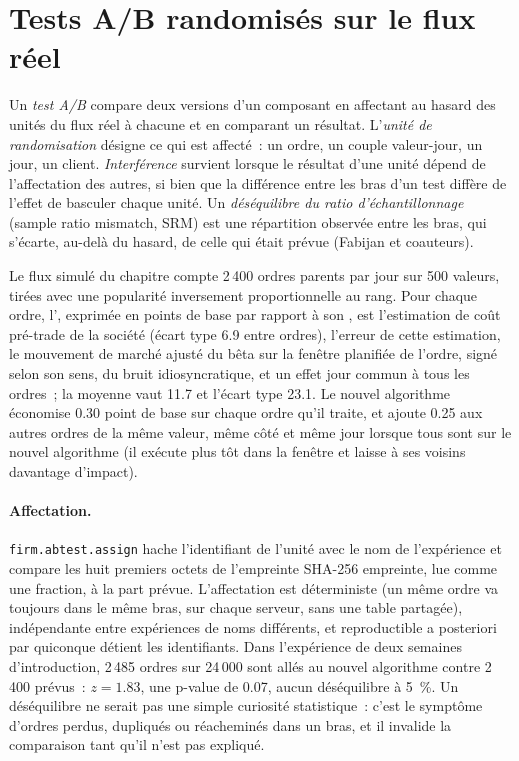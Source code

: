\section{Tests A/B randomisés sur le flux réel}

\begin{definition}\label{def:rs:live-experiments:ab}
Un \emph{test A/B} compare deux versions d'un composant en affectant au hasard des unités du flux réel à chacune et en comparant un résultat.
L'\emph{unité de randomisation} désigne ce qui est affecté~: un ordre, un couple valeur-jour, un jour, un client. \emph{Interférence}
survient lorsque le résultat d'une unité dépend de l'affectation des autres, si bien que la différence entre les bras d'un test diffère de l'effet de
basculer chaque unité. Un \emph{déséquilibre du ratio d'échantillonnage} (sample ratio mismatch, SRM) est une répartition observée entre les bras, qui s'écarte,
au-delà du hasard, de celle qui était prévue (Fabijan et coauteurs).
\end{definition}

Le flux simulé du chapitre compte 2\,400 ordres parents par jour sur 500 valeurs, tirées avec une popularité inversement proportionnelle au rang. Pour chaque ordre,
l', exprimée en points de base par rapport à son , est l'estimation de coût pré-trade de la société (écart type 6.9 entre ordres), l'erreur de cette estimation,
le mouvement de marché ajusté du bêta sur la fenêtre planifiée de l'ordre, signé selon son sens, du bruit idiosyncratique, et un effet jour commun à tous les ordres~; la moyenne
vaut 11.7 et l'écart type 23.1. Le nouvel algorithme économise 0.30 point de base sur chaque ordre qu'il traite, et ajoute 0.25 aux autres ordres de la même valeur,
même côté et même jour lorsque tous sont sur le nouvel algorithme (il exécute plus tôt dans la fenêtre et laisse à ses voisins davantage d'impact).

\paragraph{Affectation.} \texttt{firm.abtest.assign} hache l'identifiant de l'unité avec le nom de l'expérience et compare les huit premiers octets de l'empreinte SHA-256
empreinte, lue comme une fraction, à la part prévue. L'affectation est déterministe (un même ordre va toujours dans le même bras, sur chaque serveur, sans une
table partagée), indépendante entre expériences de noms différents, et reproductible a posteriori par quiconque détient les identifiants. Dans l'expérience de deux semaines
d'introduction, 2\,485 ordres sur 24\,000 sont allés au nouvel algorithme contre 2\,400 prévus~: $z = 1.83$, une p-value de 0.07, aucun déséquilibre à 5~\%. Un
déséquilibre ne serait pas une simple curiosité statistique~: c'est le symptôme d'ordres perdus, dupliqués ou réacheminés dans un bras, et il invalide la comparaison tant
qu'il n'est pas expliqué.

